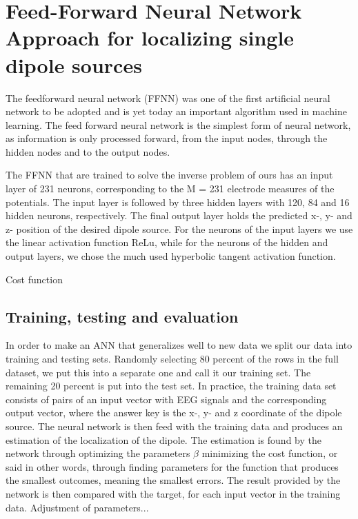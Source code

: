 \documentclass[a4paper, UKenglish, 11pt]{uiomaster}
\begin{document}

\section{Feed-Forward Neural Network Approach for localizing single dipole sources}
The feedforward neural network (FFNN) was one of the first artificial neural network to be adopted and is yet today an important algorithm used in machine learning. The feed forward neural network is the simplest form of neural network, as information is only processed forward, from the input nodes, through the hidden nodes and to the output nodes.

The FFNN that are trained to solve the inverse problem of ours has an input layer of 231 neurons, corresponding to the M = 231 electrode measures of the potentials. The input layer is followed by three hidden layers with 120, 84 and 16 hidden neurons, respectively. The final output layer holds the predicted x-, y- and z- position of the desired dipole source. For the neurons of the input layers we use the linear activation function ReLu, while for the neurons of the hidden and output layers, we chose the much used hyperbolic tangent activation function.

Cost function

\subsection{Training, testing and evaluation}
In order to make an ANN that generalizes well to new data we split our data into training and testing sets. Randomly selecting 80 percent of the rows in the full dataset, we put this into a separate one and call it our training set. The remaining 20 percent is put into the test set. In practice, the training data set consists of pairs of an input vector with EEG signals and the corresponding output vector, where the answer key is the x-, y- and z coordinate of the dipole source. The neural network is then feed with the training data and produces an estimation of the localization of the dipole. The estimation is found by the network through optimizing the parameters $\beta$ minimizing the cost function, or said in other words, through finding parameters for the function that produces the smallest outcomes, meaning the smallest errors. The result provided by the network is then compared with the target, for each input vector in the training data. Adjustment of parameters...
\end{document}
